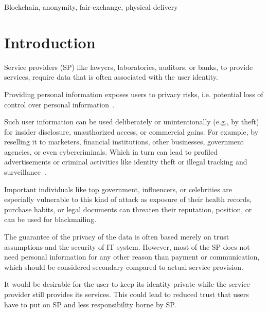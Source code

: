 \documentclass{ieeeaccess}
\begin{document}
\begin{keywords}
Blockchain, anonymity, fair-exchange, physical delivery
\end{keywords}

\titlepgskip=-15pt

\maketitle
\section{Introduction}
Service providers (SP) like lawyers, laboratories, auditors, or banks,
to provide services, require data that is often associated with the user
identity.

Providing personal information exposes users to privacy risks,
i.e. potential loss of control over personal
information~\cite{smith2011information}.

Such user information can be used deliberately or unintentionally
(e.g., by theft) for insider disclosure, unauthorized access, or
commercial gains. For example, by reselling it to marketers, financial institutions, other businesses, government agencies, or even cybercriminals. Which in turn can lead to profiled advertisements or criminal activities like identity theft or illegal tracking and surveillance~\cite{smith2011information}.

Important individuals like top government, influencers, or celebrities are especially vulnerable to this kind of attack as exposure of their health records, purchase habits, or legal documents can threaten their reputation, position, or can be used for blackmailing.

The guarantee of the privacy of the data is often based merely on trust assumptions and the security of IT system. However, most of the SP does not need personal information for any other reason than payment or communication, which should be considered secondary compared to actual service provision.

It would be desirable for the user to keep its identity private while the service provider still provides its services. This could lead to reduced trust that users have to put on SP and less responsibility borne by SP.
\end{document}
